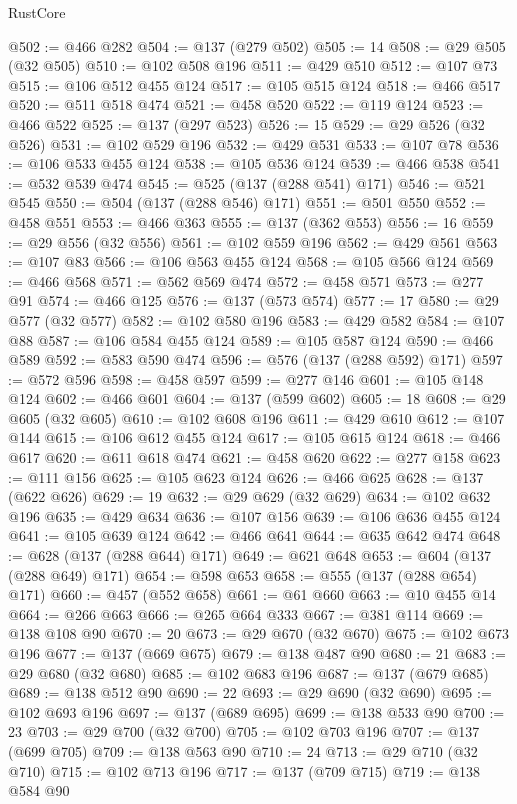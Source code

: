 \begin{lexlean}{RustCore}
\begin{coremodule}
@502 := @466 @282
@504 := @137 (@279 @502)
@505 := 14
@508 := @29 @505 (@32 @505)
@510 := @102 @508 @196
@511 := @429 @510
@512 := @107 @73
@515 := @106 @512 @455 @124
@517 := @105 @515 @124
@518 := @466 @517
@520 := @511 @518 @474
@521 := @458 @520
@522 := @119 @124
@523 := @466 @522
@525 := @137 (@297 @523)
@526 := 15
@529 := @29 @526 (@32 @526)
@531 := @102 @529 @196
@532 := @429 @531
@533 := @107 @78
@536 := @106 @533 @455 @124
@538 := @105 @536 @124
@539 := @466 @538
@541 := @532 @539 @474
@545 := @525 (@137 (@288 @541) @171)
@546 := @521 @545
@550 := @504 (@137 (@288 @546) @171)
@551 := @501 @550
@552 := @458 @551
@553 := @466 @363
@555 := @137 (@362 @553)
@556 := 16
@559 := @29 @556 (@32 @556)
@561 := @102 @559 @196
@562 := @429 @561
@563 := @107 @83
@566 := @106 @563 @455 @124
@568 := @105 @566 @124
@569 := @466 @568
@571 := @562 @569 @474
@572 := @458 @571
@573 := @277 @91
@574 := @466 @125
@576 := @137 (@573 @574)
@577 := 17
@580 := @29 @577 (@32 @577)
@582 := @102 @580 @196
@583 := @429 @582
@584 := @107 @88
@587 := @106 @584 @455 @124
@589 := @105 @587 @124
@590 := @466 @589
@592 := @583 @590 @474
@596 := @576 (@137 (@288 @592) @171)
@597 := @572 @596
@598 := @458 @597
@599 := @277 @146
@601 := @105 @148 @124
@602 := @466 @601
@604 := @137 (@599 @602)
@605 := 18
@608 := @29 @605 (@32 @605)
@610 := @102 @608 @196
@611 := @429 @610
@612 := @107 @144
@615 := @106 @612 @455 @124
@617 := @105 @615 @124
@618 := @466 @617
@620 := @611 @618 @474
@621 := @458 @620
@622 := @277 @158
@623 := @111 @156
@625 := @105 @623 @124
@626 := @466 @625
@628 := @137 (@622 @626)
@629 := 19
@632 := @29 @629 (@32 @629)
@634 := @102 @632 @196
@635 := @429 @634
@636 := @107 @156
@639 := @106 @636 @455 @124
@641 := @105 @639 @124
@642 := @466 @641
@644 := @635 @642 @474
@648 := @628 (@137 (@288 @644) @171)
@649 := @621 @648
@653 := @604 (@137 (@288 @649) @171)
@654 := @598 @653
@658 := @555 (@137 (@288 @654) @171)
@660 := @457 (@552 @658)
@661 := @61 @660
@663 := @10 @455 @14
@664 := @266 @663
@666 := @265 @664 @333
@667 := @381 @114
@669 := @138 @108 @90
@670 := 20
@673 := @29 @670 (@32 @670)
@675 := @102 @673 @196
@677 := @137 (@669 @675)
@679 := @138 @487 @90
@680 := 21
@683 := @29 @680 (@32 @680)
@685 := @102 @683 @196
@687 := @137 (@679 @685)
@689 := @138 @512 @90
@690 := 22
@693 := @29 @690 (@32 @690)
@695 := @102 @693 @196
@697 := @137 (@689 @695)
@699 := @138 @533 @90
@700 := 23
@703 := @29 @700 (@32 @700)
@705 := @102 @703 @196
@707 := @137 (@699 @705)
@709 := @138 @563 @90
@710 := 24
@713 := @29 @710 (@32 @710)
@715 := @102 @713 @196
@717 := @137 (@709 @715)
@719 := @138 @584 @90

\end{coremodule}
\end{lexlean}
